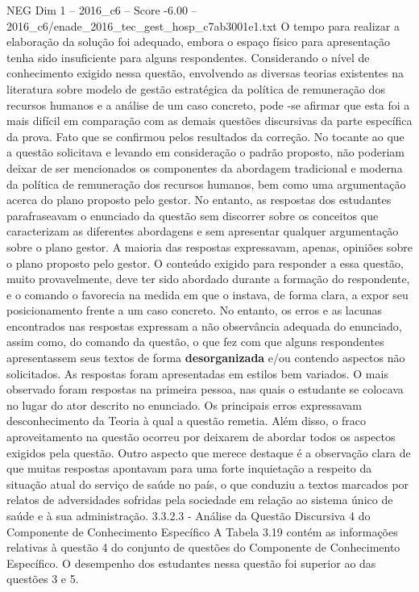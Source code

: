 \begin{textsample}{NEG Dim 1 – 2016\_c6 – Score -6.00 – 2016\_c6/enade\_2016\_tec\_gest\_hosp\_c7ab3001e1.txt}
O tempo para realizar a elaboração da solução foi adequado, embora o espaço físico para apresentação tenha sido insuficiente para alguns respondentes.
Considerando o nível de conhecimento exigido nessa questão, envolvendo as diversas teorias existentes na literatura sobre modelo de gestão estratégica da política de remuneração dos recursos humanos e a análise de um caso concreto, pode -se afirmar que esta foi a mais difícil em comparação com as demais questões discursivas da parte específica da prova.
Fato que se confirmou pelos resultados da correção.
No tocante ao que a questão solicitava e levando em consideração o padrão proposto, não poderiam deixar de ser mencionados os componentes da abordagem tradicional e moderna da política de remuneração dos recursos humanos, bem como uma argumentação acerca do plano proposto pelo gestor.
No entanto, as respostas dos estudantes parafraseavam o enunciado da questão sem discorrer sobre os conceitos que caracterizam as diferentes abordagens e sem apresentar qualquer argumentação sobre o plano gestor.
A maioria das respostas expressavam, apenas, opiniões sobre o plano proposto pelo gestor.
O conteúdo exigido para responder a essa questão, muito provavelmente, deve ter sido abordado durante a formação do respondente, e o comando o favorecia na medida em que o instava, de forma clara, a expor seu posicionamento frente a um caso concreto.
No entanto, os erros e as lacunas encontrados nas respostas expressam a não observância adequada do enunciado, assim como, do comando da questão, o que fez com que alguns respondentes apresentassem seus textos de forma \textbf{desorganizada} e/ou contendo aspectos não solicitados.
As respostas foram apresentadas em estilos bem variados.
O mais observado foram respostas na primeira pessoa, nas quais o estudante se colocava no lugar do ator descrito no enunciado.
Os principais erros expressavam desconhecimento da Teoria à qual a questão remetia.
Além disso, o fraco aproveitamento na questão ocorreu por deixarem de abordar todos os aspectos exigidos pela questão.
Outro aspecto que merece destaque é a observação clara de que muitas respostas apontavam para uma forte inquietação a respeito da situação atual do serviço de saúde no país, o que conduziu a textos marcados por relatos de adversidades sofridas pela sociedade em relação ao sistema único de saúde e à sua administração. 3.3.2.3 - Análise da Questão Discursiva 4 do Componente de Conhecimento Específico A Tabela 3.19 contém as informações relativas à questão 4 do conjunto de questões do Componente de Conhecimento Específico.
O desempenho dos estudantes nessa questão foi superior ao das questões 3 e 5.

\end{textsample}
